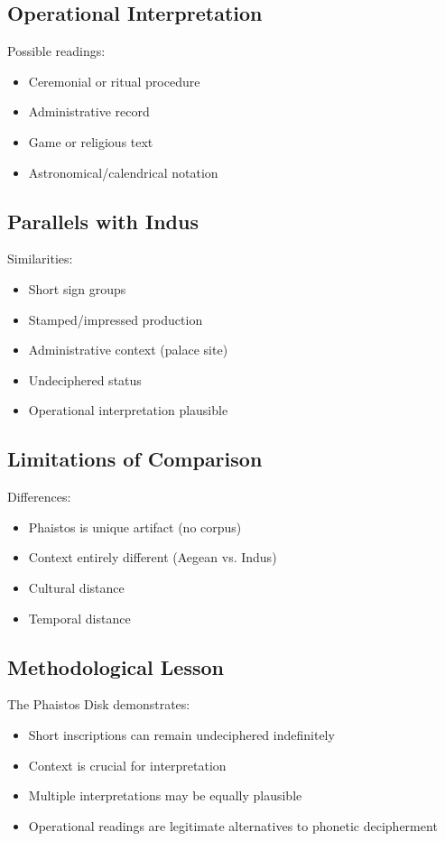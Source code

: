 \subsection{Operational Interpretation}

Possible readings:
\begin{itemize}
    \item Ceremonial or ritual procedure
    \item Administrative record
    \item Game or religious text
    \item Astronomical/calendrical notation
\end{itemize}

\subsection{Parallels with Indus}

Similarities:
\begin{itemize}
    \item Short sign groups
    \item Stamped/impressed production
    \item Administrative context (palace site)
    \item Undeciphered status
    \item Operational interpretation plausible
\end{itemize}

\subsection{Limitations of Comparison}

Differences:
\begin{itemize}
    \item Phaistos is unique artifact (no corpus)
    \item Context entirely different (Aegean vs. Indus)
    \item Cultural distance
    \item Temporal distance
\end{itemize}

\subsection{Methodological Lesson}

The Phaistos Disk demonstrates:
\begin{itemize}
    \item Short inscriptions can remain undeciphered indefinitely
    \item Context is crucial for interpretation
    \item Multiple interpretations may be equally plausible
    \item Operational readings are legitimate alternatives to phonetic decipherment
\end{itemize}
